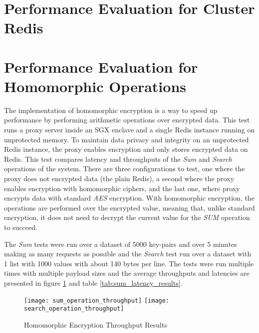\section{Performance Evaluation for Cluster Redis}
\label{sec:performance_evaluation_cluster_redis}

\section{Performance Evaluation for Homomorphic Operations}
\label{sec:performance_evaluation_homomorphic_operations}

The implementation of homomorphic encryption is a way to speed up performance by performing arithmetic operations over encrypted data. This test runs a proxy server inside an \gls{SGX} enclave and a single Redis instance running on unprotected memory. To maintain data privacy and integrity on an unprotected Redis instance, the proxy enables encryption and only stores encrypted data on Redis. This test compares latency and throughputs of the \textit{Sum} and \textit{Search} operations of the system. There are three configurations to test, one where the proxy does not encrypted data (the plain Redis), a second where the proxy enables encryption with homomorphic ciphers, and the last one, where proxy encrypts data with standard \textit{AES} encryption. With homomorphic encryption, the operations are performed over the encrypted value, meaning that, unlike standard encryption, it does not need to decrypt the current value for the \textit{SUM} operation to succeed.

The \textit{Sum} tests were run over a dataset of 5000 key-pairs and over 5 minutes making as many requests as possible and the \textit{Search} test run over a dataset with 1 list with 1000 values with about 140 bytes per line. The tests were run multiple times with multiple payload sizes and the average throughputs and latencies are presented in figure \ref{fig:homomorphic_encryption_throughput_results} and table \ref{tab:sum_latency_results}.

\begin{figure}[htbp]
  \centering
    {\texttt{[image: sum\_operation\_throughput]}}%
    {\texttt{[image: search\_operation\_throughput]}}%
  \caption{Homomorphic Encryption Throughput Results}
  \label{fig:homomorphic_encryption_throughput_results}
\end{figure}

